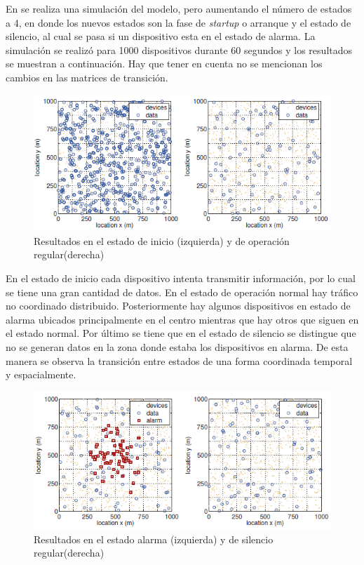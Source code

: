 \documentclass[journal]{IEEEtran}
\begin{document}
En \cite{art3} se realiza una simulaci\'on del modelo, pero aumentando el n\'umero de estados a 4, en donde los nuevos estados son la fase de \emph{startup} o arranque y el estado de silencio, al cual se pasa si un dispositivo esta en el estado de alarma. La simulaci\'on se realiz\'o para 1000 dispositivos durante 60 segundos y los resultados se muestran a continuaci\'on. Hay que tener en cuenta no se mencionan los cambios en las matrices de transici\'on.

\begin{figure}[H]
\centering
\includegraphics[scale=0.7]{graf3}
\caption{Resultados en el estado de inicio (izquierda) y de operaci\'on regular(derecha)}
\label{CMMPP1}
\end{figure}

En el estado de inicio cada dispositivo intenta transmitir informaci\'on, por lo cual se tiene una gran cantidad de datos. En el estado de operaci\'on normal hay tr\'afico no coordinado distribuido. Posteriormente hay algunos dispositivos en estado de alarma ubicados principalmente en el centro mientras que hay otros que siguen en el estado normal. Por \'ultimo se tiene que en el estado de silencio se distingue que no se generan datos en la zona donde estaba los dispositivos en alarma. De esta manera se observa la transici\'on entre estados de una forma coordinada temporal y espacialmente.

\begin{figure}[H]
\centering
\includegraphics[scale=0.7]{graf4}
\caption{Resultados en el estado alarma (izquierda) y de silencio regular(derecha)}
\label{CMMPP2}
\end{figure}
\end{document}
